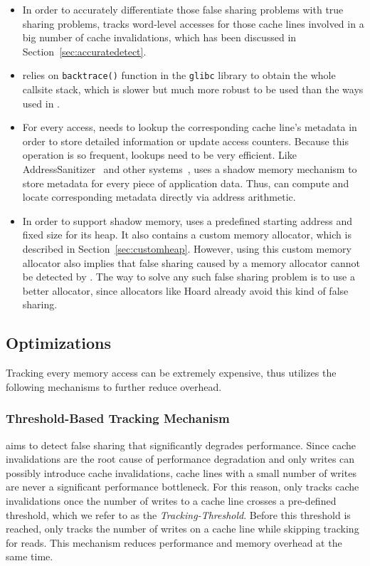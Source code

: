 \begin{itemize}
\item

In order to accurately differentiate those false sharing problems with true sharing problems, \Predator{} tracks word-level accesses for those cache lines involved in a big number of cache invalidations, which has been discussed in Section~\ref{sec:accuratedetect}.


\item
\predator{} relies on \texttt{backtrace()} function in the \texttt{glibc} library to obtain the whole callsite stack, which is slower but much more robust to be used than the ways used in \SheriffDetect{}.


\item
For every access, \Predator{} needs to lookup the corresponding cache line's metadata 
in order to store detailed information or update access counters. Because this operation is so frequent,
 lookups need to be very efficient.
Like AddressSanitizer~\cite{AddressSanitizer} and other systems~\cite{qinzhao,Valgrind},
\Predator{} uses a shadow memory mechanism to store metadata for every piece of application data. 
Thus, \Predator{} can compute and locate corresponding metadata directly via address arithmetic.

\item
In order to support shadow memory, \Predator{} uses a predefined starting address and fixed size for its heap.  It also contains a custom memory allocator, which is described in Section~\ref{sec:customheap}.  However, using this custom memory allocator also implies that false sharing caused by a memory allocator cannot be detected by \Predator{}. The way to solve any such false sharing problem is to use a better allocator, since allocators like Hoard already avoid this kind of false sharing.

\end{itemize} 
 
\subsection{Optimizations}
\label{optimization}
Tracking every memory access can be extremely expensive, thus \Predator{} utilizes the following mechanisms to further reduce overhead.

\subsubsection{Threshold-Based Tracking Mechanism}
\label{sec:thresholdtracking}
\Predator{} aims to detect false sharing that significantly degrades performance. Since cache invalidations are the root cause of performance degradation and only writes 
can possibly introduce cache invalidations, 
cache lines with a small number of writes are never a significant performance bottleneck.
For this reason, \Predator{} only tracks cache invalidations
once the number of writes to a cache line crosses a
pre-defined threshold, which we refer to as the {\it Tracking-Threshold}. 
Before this threshold is reached, \Predator{} only tracks the number of writes on a cache line 
while skipping tracking for reads.
This mechanism reduces performance and memory overhead
at the same time.

